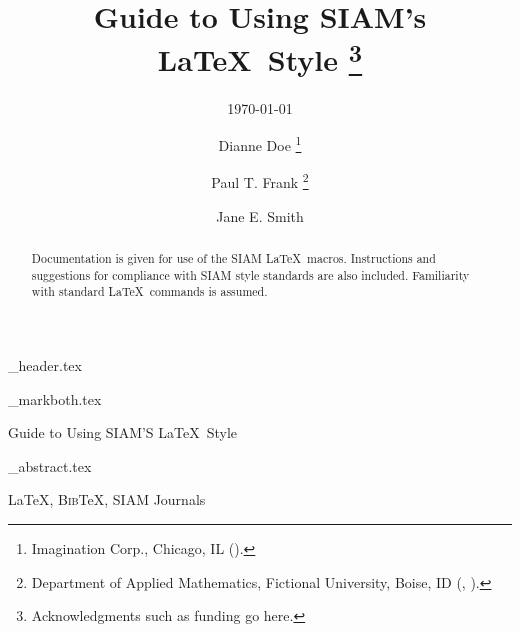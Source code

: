 \documentclass[]{siamart}
\newcommand{\BibTeX}{{\scshape Bib}\TeX\xspace}
\begin{document}
\begin{tcbverbatimwrite}{\jobname_header.tex}
\title{Guide to Using SIAM's \LaTeX\ Style%
  \thanks{Acknowledgments such as funding go here.}}

\subtitle{\today} 

\author{Dianne Doe%
  \thanks{Imagination Corp., Chicago, IL ().}%
  \and
  Paul T. Frank%
  \thanks{Department of Applied Mathematics, Fictional University, Boise, ID
    (, ).}
  \and
  Jane E. Smith%
  \footnotemark[3]
}

\maketitle

\end{tcbverbatimwrite}


\begin{tcbverbatimwrite}{\jobname_markboth.tex}
\pagestyle{myheadings}
\thispagestyle{plain}
%
{Guide to Using  SIAM'S \LaTeX\ Style}
\end{tcbverbatimwrite}




\begin{tcbverbatimwrite}{\jobname_abstract.tex}
\begin{abstract}
  Documentation is given for use of the SIAM \LaTeX\ macros.
  Instructions and suggestions for compliance with SIAM style
  standards are also included. Familiarity with standard \LaTeX\
  commands is assumed.
\end{abstract}

\begin{keywords}
  \LaTeX, \BibTeX, SIAM Journals 
\end{keywords}

\begin{AMS}
\end{AMS}
\end{tcbverbatimwrite}

\end{document}
